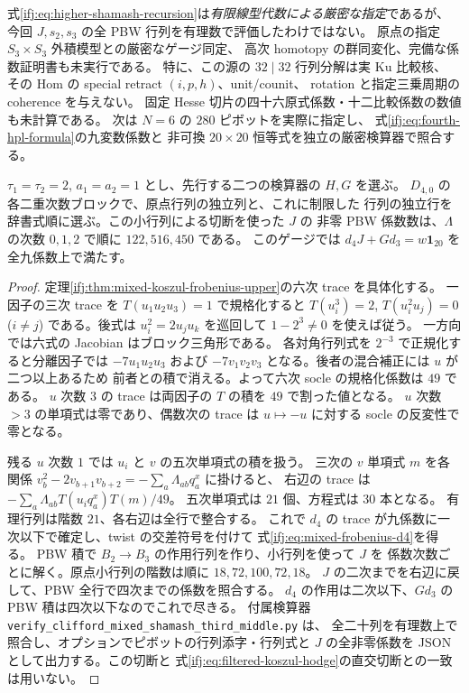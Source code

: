 \begin{remark}[証明範囲と次の計算]
式\eqref{ifj:eq:higher-shamash-recursion}は\emph{有限線型代数による厳密な指定}であるが、
今回 $J,s_2,s_3$ の全 PBW 行列を有理数で評価したわけではない。
原点の指定 $S_3\times S_3$ 外積模型との厳密なゲージ同定、
高次 homotopy の群同変化、完備な係数証明書も未実行である。
特に、この源の $32\mid32$ 行列分解は実 Ku 比較核、
その Hom の special retract $(i,p,h)$、unit/counit、
rotation と指定三乗周期の coherence を与えない。
固定 Hesse 切片の四十六原式係数・十二比較係数の数値も未計算である。
次は $N=6$ の $280$ ピボットを実際に指定し、
式\eqref{ifj:eq:fourth-hpl-formula}の九変数係数と
非可換 $20\times20$ 恒等式を独立の厳密検算器で照合する。
\end{remark}

\begin{proposition}
\label{ifj:prop:third-middle-certificate}
$\tau_1=\tau_2=2$, $a_1=a_2=1$ とし、先行する二つの検算器の $H,G$ を選ぶ。
$D_{4,0}$ の各二重次数ブロックで、原点行列の独立列と、これに制限した
行列の独立行を辞書式順に選ぶ。この小行列による切断を使った $J$ の
非零 PBW 係数数は、$\Lambda$ の次数 $0,1,2$ で順に $122,516,450$ である。
このゲージでは $d_4J+Gd_3=w\mathbf1_{20}$ を全九係数上で満たす。
\end{proposition}

\begin{proof}
定理\ref{ifj:thm:mixed-koszul-frobenius-upper}の六次 trace を具体化する。
一因子の三次 trace を $T(u_1u_2u_3)=1$ で規格化すると
$T(u_i^3)=2$, $T(u_i^2u_j)=0$ ($i\ne j$) である。後式は
$u_i^2=2u_ju_k$ を巡回して $1-2^3\ne0$ を使えば従う。
一方向では六式の Jacobian はブロック三角形である。
各対角行列式を $2^{-3}$ で正規化すると分離因子では $-7u_1u_2u_3$
および $-7v_1v_2v_3$ となる。後者の混合補正には $u$ が二つ以上あるため
前者との積で消える。よって六次 socle の規格化係数は $49$ である。
$u$ 次数 $3$ の trace は両因子の $T$ の積を $49$ で割った値となる。
$u$ 次数 $>3$ の単項式は零であり、偶数次の trace は
$u\mapsto-u$ に対する socle の反変性で零となる。

残る $u$ 次数 $1$ では $u_i$ と $v$ の五次単項式の積を扱う。
三次の $v$ 単項式 $m$ を各関係
$v_b^2-2v_{b+1}v_{b+2}=-\sum_a\Lambda_{ab}q^x_a$ に掛けると、
右辺の trace は $-\sum_a\Lambda_{ab}T(u_iq_a^x)T(m)/49$。
五次単項式は $21$ 個、方程式は $30$ 本となる。
有理行列は階数 $21$、各右辺は全行で整合する。
これで $d_4$ の trace が九係数に一次以下で確定し、twist の交差符号を付けて
式\eqref{ifj:eq:mixed-frobenius-d4}を得る。
PBW 積で $B_2\to B_3$ の作用行列を作り、小行列を使って $J$ を
係数次数ごとに解く。原点小行列の階数は順に $18,72,100,72,18$。
$J$ の二次までを右辺に戻して、PBW 全行で四次までの係数を照合する。
$d_4$ の作用は二次以下、$Gd_3$ の PBW 積は四次以下なのでこれで尽きる。
付属検算器 \texttt{verify\_clifford\_mixed\_shamash\_third\_middle.py} は、
全二十列を有理数上で照合し、オプションでピボットの行列添字・行列式と
$J$ の全非零係数を JSON として出力する。この切断と
式\eqref{ifj:eq:filtered-koszul-hodge}の直交切断との一致は用いない。
\end{proof}
